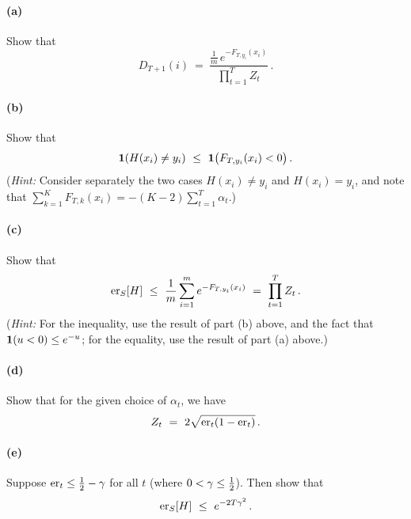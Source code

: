 \paragraph{(a)}
Show that
\[
D_{T+1}(i) ~ = ~ \frac{\frac{1}{m} \, e^{-F_{T,y_i}(x_i)}}{\prod_{t=1}^T Z_t}
	\,.
\] 
\paragraph{(b)}
Show that 
\[
{\mathbf 1}(H(x_i)\neq y_i) ~ \leq ~
	{\mathbf 1}\big( F_{T,y_i}(x_i) < 0 \big)
	\,.
\]
(\emph{Hint:} Consider separately the two cases $H(x_i)\neq y_i$ and $H(x_i) = y_i$, and note that $\sum_{k=1}^K F_{T,k}(x_i) = -(K-2)\sum_{t=1}^T \alpha_t$.)
\paragraph{(c)}
Show that 
\[
\textup{\textrm{er}}_S[H] ~ \leq ~
	\frac{1}{m} \sum_{i=1}^m e^{-F_{T,y_i}(x_i)}
	~ = ~
	\prod_{t=1}^T Z_t
	\,.
\]
(\emph{Hint:} For the inequality, use the 
result of part (b) above, 
and the fact that ${\mathbf 1}(u<0) \leq e^{-u}$; for the equality, use the result of part (a) above.)
\paragraph{(d)}
Show that for the given choice of $\alpha_t$, we have 
\[
Z_t ~ = ~ 2 \sqrt{\textup{\textrm{er}}_t(1-\textup{\textrm{er}}_t)}
	\,.
\]
\paragraph{(e)}
Suppose $\textup{\textrm{er}}_t \leq \frac{1}{2} - \gamma$ for all $t$ (where $0 < \gamma \leq \frac{1}{2}$). Then show that 
\[
\textup{\textrm{er}}_S[H] ~ \leq ~ e^{-2T\gamma^2}
	\,.
\]

